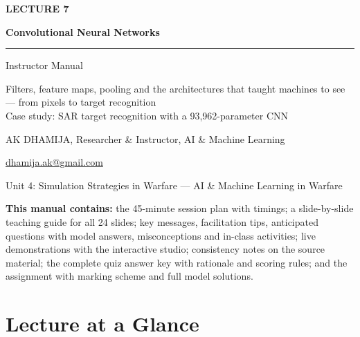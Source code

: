 \documentclass[11pt]{article}
\begin{document}
\begin{titlepage}\centering\vspace*{2.2cm}
{\color{AccN}\large\bfseries LECTURE 7\par}\vspace{0.6cm}
{\color{NavyN}\Huge\bfseries Convolutional Neural Networks\par}\vspace{0.6cm}
{\color{AccN}\rule{0.7\textwidth}{1.5pt}}\par\vspace{0.6cm}
{\LARGE Instructor Manual\par}\vspace{0.4cm}
{\large\begin{minipage}{0.85\textwidth}\centering Filters, feature maps, pooling and the architectures that taught machines to see --- from pixels to target recognition\\Case study: SAR target recognition with a 93,962-parameter CNN\end{minipage}\par}\vspace{2cm}
{\large AK DHAMIJA, Researcher \& Instructor, AI \& Machine Learning\par}\vspace{0.2cm}
{\normalsize \href{mailto:dhamija.ak@gmail.com}{dhamija.ak@gmail.com} \quad\textbullet{}\par}\vspace{0.3cm}
{Unit 4: Simulation Strategies in Warfare --- AI \& Machine Learning in Warfare\par}\vfill
\begin{tcolorbox}[colback=NavyN!4,colframe=NavyN,boxrule=0.6pt,arc=2pt,width=0.9\textwidth]\small
\textbf{This manual contains:} the 45-minute session plan with timings; a slide-by-slide teaching guide for all 24 slides; key messages, facilitation tips, anticipated questions with model answers, misconceptions and in-class activities; live demonstrations with the interactive studio; consistency notes on the source material; the complete quiz answer key with rationale and scoring rules; and the assignment with marking scheme and full model solutions.
\end{tcolorbox}
\end{titlepage}
\tableofcontents\newpage


\section{Lecture at a Glance}
\end{document}
